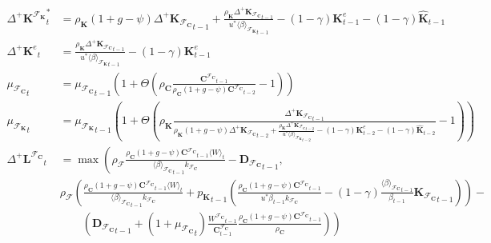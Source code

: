 \documentclass[a4paper, headings=standardclasses]{scrartcl}
\numberwithin{equation}{subsection}
\begin{document}
{\begin{align}
		{\Delta^+\mathbf{K}^{\mathcal{F}_\mathbf{K}}}^*_t & = \rho_\mathbf{K} (1 + g - \psi){\Delta^+\mathbf{K}_{\mathcal{F}_\mathbf{C}}}_{t-1} + \frac{\rho_\mathbf{K} {\Delta^+\mathbf{K}_{\mathcal{F}_\mathbf{C}}}_{t-1}}{u^* {\langle \beta \rangle_{\mathcal{F}_\mathbf{K}}}_{t-1}} - (1-\gamma) \mathbf{K}^e_{t-1} - (1-\gamma)\hat{\mathbf{K}}_{t-1} \\
		{\Delta^+\mathbf{K}^e}_t & = \frac{\rho_\mathbf{K} {\Delta^+\mathbf{K}_{\mathcal{F}_\mathbf{C}}}_{t-1}}{u^* {\langle \beta \rangle_{\mathcal{F}_\mathbf{K}}}_{t-1}} - (1-\gamma) \mathbf{K}^e_{t-1} \\
		{\mu_{\mathcal{F}_\mathbf{C}}}_t                  & = {\mu_{\mathcal{F}_\mathbf{C}}}_{t-1}\left(1+ \Theta \left(\rho_\mathbf{C} \frac{{\mathbf{C}^{\mathcal{F}_\mathbf{C}}}_{t-1}}{\rho_\mathbf{C} (1 + g - \psi) {\mathbf{C}^{\mathcal{F}_\mathbf{C}}}_{t-2}} - 1\right) \right)                                                                              \\
		{\mu_{\mathcal{F}_\mathbf{K}}}_t                  & = {\mu_{\mathcal{F}_\mathbf{K}}}_{t-1}\left(1+ \Theta \left(\rho_\mathbf{K} \frac{{\Delta^+\mathbf{K}_{\mathcal{F}_\mathbf{C}}}_{t-1}}{\rho_\mathbf{K} (1 + g - \psi){\Delta^+\mathbf{K}_{\mathcal{F}_\mathbf{C}}}_{t-2} + \frac{\rho_\mathbf{K} {\Delta^+\mathbf{K}_{\mathcal{F}_\mathbf{C}}}_{t-2}}{u^* {\langle \beta \rangle_{\mathcal{F}_\mathbf{K}}}_{t-2}} - (1-\gamma) \mathbf{K}^e_{t-2} - (1-\gamma)\hat{\mathbf{K}}_{t-2}} - 1\right) \right) \\
		{\Delta^+{\mathbf{L}^{\mathcal{F}_\mathbf{C}}}}_t & = \max\left(\rho_\mathcal{F} \frac{\rho_\mathbf{C} (1 + g - \psi) {\mathbf{C}^{\mathcal{F}_\mathbf{C}}}_{t-1} \langle W \rangle_t}{{\langle\beta\rangle_{\mathcal{F}_\mathbf{C}}}_{t-1} k_{\mathcal{F}_\mathbf{C}}} - {\mathbf{D}_{\mathcal{F}_\mathbf{C}}}_{t-1}, \right. \\ 
		& \rho_\mathcal{F} \left(\frac{\rho_\mathbf{C} (1 + g - \psi) {\mathbf{C}^{\mathcal{F}_\mathbf{C}}}_{t-1} \langle W \rangle_t}{{\langle\beta\rangle_{\mathcal{F}_\mathbf{C}}}_{t-1} k_{\mathcal{F}_\mathbf{C}}} + {p_\mathbf{K}}_{t-1} \left(\frac{\rho_\mathbf{C} (1 + g - \psi) {\mathbf{C}^{\mathcal{F}_\mathbf{C}}}_{t-1}}{u^* \beta_{t-1} k_{\mathcal{F}_\mathbf{C}}} - (1 - \gamma) \frac{{\langle\beta\rangle_{\mathcal{F}_\mathbf{C}}}_{t-1}}{\beta_{t-1}} {\mathbf{K}_{\mathcal{F}_\mathbf{C}}}_{t-1}\right) \right) - \nonumber \\
		&\qquad \left.\left( {\mathbf{D}_{\mathcal{F}_\mathbf{C}}}_{t-1} + (1+{\mu_{\mathcal{F}_\mathbf{C}}}_t) \frac{{W^{\mathcal{F}_\mathbf{C}}}_{t-1}}{\mathbf{C}^{\mathcal{F}_\mathbf{C}}_{t-1}} \frac{\rho_\mathbf{C} (1 + g - \psi) {\mathbf{C}^{\mathcal{F}_\mathbf{C}}}_{t-1}}{\rho_\mathbf{C}}\right)\right) \nonumber \\

\end{align}}
\end{document}
